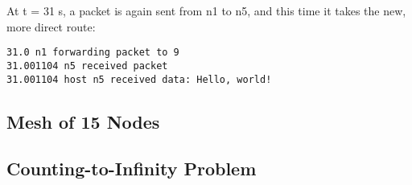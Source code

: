 \documentclass[11pt]{article}
\begin{document}
At t = 31 s, a packet is again sent from n1 to n5, and this time it takes the new, more direct route:

\begin{lstlisting}
31.0 n1 forwarding packet to 9
31.001104 n5 received packet
31.001104 host n5 received data: Hello, world!
\end{lstlisting}

\subsection{Mesh of 15 Nodes}

\subsection{Counting-to-Infinity Problem}
\end{document}
